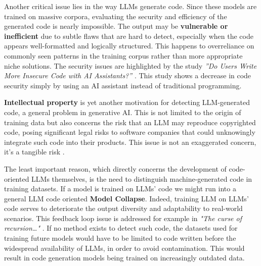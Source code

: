 \vspace{1\baselineskip}
\noindent

Another critical issue lies in the way LLMs generate code. 
Since these models are trained on massive corpora, 
evaluating the security and efficiency of the generated 
code is nearly impossible. The output may be 
\textbf{vulnerable or inefficient} 
due to subtle flaws that are hard to detect, especially 
when the code appears well-formatted and logically 
structured. 
This happens to overreliance on 
commonly seen patterns in the training corpus rather 
than more appropriate niche solutions.
The security issues are highlighted by the study
\textit{”Do Users Write More Insecure Code with AI Assistants?”} 
\cite{perry2022users}. This study shows a decrease in
code security simply by using an AI assistant instead of
traditional programming.


\vspace{1\baselineskip}
\noindent

\textbf{Intellectual property} is yet another motivation 
for detecting LLM-generated code, a general problem 
in generative AI. This is not limited to the origin 
of training data but also concerns the risk that an 
LLM may reproduce copyrighted code, posing 
significant legal risks to software companies 
that could unknowingly integrate such code into 
their products.
This issue is not an exaggerated concern, 
it's a tangible risk \cite{DoeVGitHub2024}.


\vspace{1\baselineskip}
\noindent

The least important reason, 
which directly 
concerns the development of code-oriented 
LLMs themselves, is the need to distinguish 
machine-generated code in training datasets. 
If a model is trained on LLMs' code we might run into
a general LLM code oriented \textbf{Model Collapse}. 
Indeed, training LLM on LLMs' code serves to deteriorate the 
output diversity and adaptability to real-world scenarios.
This feedback loop issue is addressed for example in 
\textit{"The curse of recursion…"} 
\cite{shumailov2023curse}.
If no method exists to detect such code, the 
datasets used for training future models would 
have to be limited to code written before the 
widespread availability of LLMs, in order to 
avoid contamination. This would result in 
code generation models being trained on 
increasingly outdated data. 


